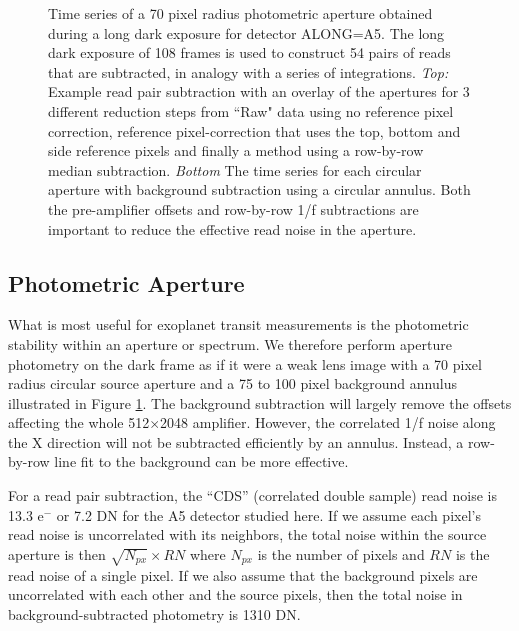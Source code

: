 \documentclass{aastex62}
\begin{document}
\begin{figure}[!hbtp]
\caption{Time series of a 70 pixel radius photometric aperture obtained during a long dark exposure for detector ALONG=A5. The long dark exposure of 108 frames is used to construct 54 pairs of reads that are subtracted, in analogy with a series of integrations.
{\it Top:}  Example read pair subtraction with an overlay of the apertures for 3 different reduction steps from ``Raw" data using no reference pixel correction, reference pixel-correction that uses the top, bottom and side reference pixels and finally a method using a row-by-row median subtraction.
{\it Bottom} The time series for each circular aperture with background subtraction using a circular annulus.
Both the pre-amplifier offsets and row-by-row 1/f subtractions are important to reduce the effective read noise in the aperture.
}\label{fig:longDarkPhot}
\end{figure}

\subsection{Photometric Aperture}\label{sec:photApertureDark}

What is most useful for exoplanet transit measurements is the photometric stability within an aperture or spectrum.
We therefore perform aperture photometry on the dark frame as if it were a weak lens image with a 70 pixel radius circular source aperture and a 75 to 100 pixel background annulus illustrated in Figure \ref{fig:longDarkPhot}.
The background subtraction will largely remove the offsets affecting the whole 512$\times$2048 amplifier.
However, the correlated 1/f noise along the X direction will not be subtracted efficiently by an annulus.
Instead, a row-by-row line fit to the background can be more effective.

For a read pair subtraction, the ``CDS'' (correlated double sample) read noise is 13.3 e$^-$ or 7.2 DN for the A5 detector studied here.
If we assume each pixel's read noise is uncorrelated with its neighbors, the total noise within the source aperture is then $\sqrt{N_{px}} \times RN $ where $N_{px}$ is the number of pixels and $RN$ is the read noise of a single pixel.
If we also assume that the background pixels are uncorrelated with each other and the source pixels, then the total noise in background-subtracted photometry is 1310 DN.
\end{document}
